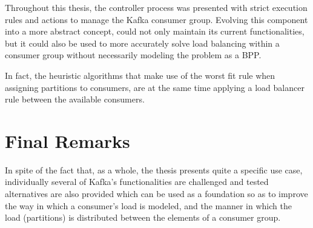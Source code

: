 Throughout this thesis, the controller process was presented with strict
execution rules and actions to manage the Kafka consumer group. Evolving this
component into a more abstract concept, could not only maintain its current
functionalities, but it could also be used to more accurately solve load
balancing within a consumer group without necessarily modeling the problem as a
BPP. 

In fact, the heuristic algorithms that make use of the worst fit rule when
assigning partitions to consumers, are at the same time applying a load balancer
rule between the available consumers.

\section{Final Remarks}

In spite of the fact that, as a whole, the thesis presents quite a specific use
case, individually several of Kafka's functionalities are challenged and tested
alternatives are also provided which can be used as a foundation so as to
improve the way in which a consumer's load is modeled, and the manner in which
the load (partitions) is distributed between the elements of a consumer group.
